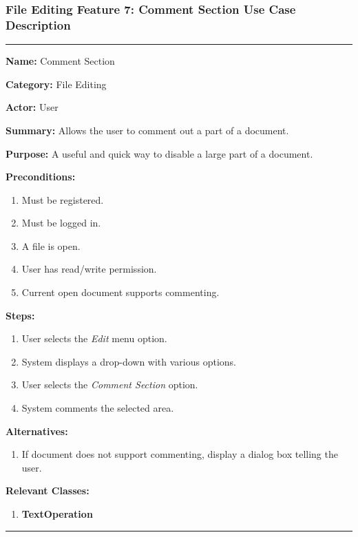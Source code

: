 \documentclass[twoside,letterpaper]{article}
\begin{document}
	\subsubsection[File Editing Feature 7: Comment Section]{\rmfamily\bfseries\color{black}
		File Editing Feature 7: Comment Section Use Case Description}
	\hypertarget{RefHeading22059017292}{}
	
	\vspace{2pt}
	\hrule
	\vspace{8pt}
		\noindent\textbf{Name:} Comment Section \newline
		
		\noindent\textbf{Category:} File Editing \newline
		
		\noindent\textbf{Actor:} User \newline
		
		\noindent\textbf{Summary:} Allows the user to comment out a part of a document. \newline
		
		\noindent\textbf{Purpose:} A useful and quick way to disable a large part of a document. \newline
		
		\noindent\textbf{Preconditions:}
		\begin{enumerate}
			\item Must be registered.
			\item Must be logged in.
			\item A file is open.
			\item User has read/write permission.
			\item Current open document supports commenting.
		\end{enumerate}
		\noindent\textbf{Steps:}
		\begin{enumerate}
			\item User selects the \textit{Edit} menu option.
			\item System displays a drop-down with various options.
			\item User selects the \textit{Comment Section} option.
			\item System comments the selected area.
		\end{enumerate}
		\noindent\textbf{Alternatives:}
		\begin{enumerate}
			\item If document does not support commenting, display a dialog box telling the user.
		\end{enumerate}
		\noindent\textbf{Relevant Classes:}
		\begin{enumerate}
			\item \textbf {TextOperation}
		\end{enumerate}
	\vspace{8pt}
	\hrule
	\newpage
	
\end{document}
